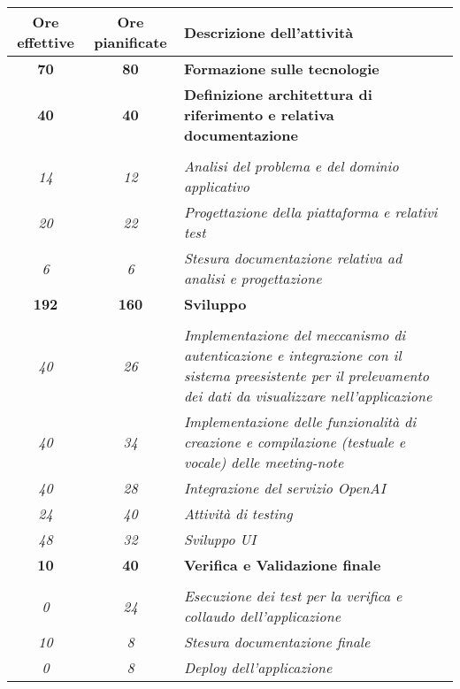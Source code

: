 \begin{table}
    \centering
    \begin{tabularx}{\textwidth}{|c|c|X|}
        \hline
        \textbf{Ore effettive} & \textbf{Ore pianificate} & \textbf{Descrizione dell'attività} \\\hline
        
        \textbf{70} & \textbf{80} & \textbf{Formazione sulle tecnologie} \\	 
        \hline
        
        \textbf{40} & \textbf{40} & \textbf{Definizione architettura di riferimento e relativa documentazione} \\ \hdashline 
        \multirow{3}{0cm}\\ 
        \textit{14} &
        \textit{12} & 
        \textit{Analisi del problema e del dominio applicativo} \\
        \textit{20} &
        \textit{22} & 
        \textit{Progettazione della piattaforma e relativi test} \\
        \textit{6} &
        \textit{6} & 
        \textit{Stesura documentazione relativa ad analisi e progettazione} \\
        \hline
        

        \textbf{192} & \textbf{160} & \textbf{Sviluppo}  \\ \hdashline 
        \multirow{5}{0cm}\\ 
        \textit{40} &
        \textit{26} & 
        \textit{Implementazione del meccanismo di autenticazione e integrazione con il sistema preesistente per il prelevamento dei dati da visualizzare nell'applicazione} \\
        \textit{40} &
        \textit{34} & 
        \textit{Implementazione delle funzionalità di creazione e compilazione (testuale e vocale) delle meeting-note} \\
        \textit{40} &
        \textit{28} & 
        \textit{Integrazione del servizio OpenAI} \\
        \textit{24} &
        \textit{40} & 
        \textit{Attività di testing} \\
        \textit{48} &
        \textit{32} & 
        \textit{Sviluppo UI} \\
        \hline
        
        \textbf{10} & \textbf{40} & \textbf{Verifica e Validazione finale}  \\ \hdashline 
        \multirow{3}{0cm}\\ 
        \textit{0} &
        \textit{24} & 
        \textit{Esecuzione dei test per la verifica e collaudo dell'applicazione} \\
        \textit{10} &
        \textit{8} & 
        \textit{Stesura documentazione finale} \\
        \textit{0} &
        \textit{8} & 
        \textit{Deploy dell'applicazione} \\
        \hline
        

\end{tabularx}
\end{table}
